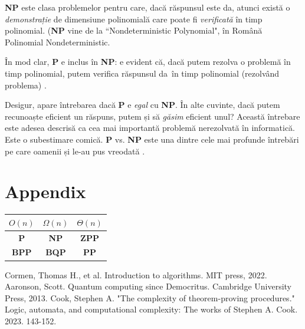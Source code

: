 \documentclass{article}
\begin{document}
\textbf{NP} este clasa problemelor pentru care, dacă răspunsul este \glqq
da\grqq, atunci există o \emph{demonstrație} de dimensiune polinomială care
poate fi \emph{verificată} în timp polinomial. (\textbf{NP} vine de la
``Nondeterministic Polynomial", în Română \glqq Polinomial Nondeterministic\grqq \cite{qcsd}.

În mod clar, \textbf{P} e inclus în \textbf{NP}: e evident că, dacă putem
rezolva o problemă în timp polinomial, putem verifica răspunsul \glqq da\grqq \
în timp polinomial (rezolvând problema) \cite{cook_pvsnp}.

Desigur, apare întrebarea dacă \textbf{P} e \emph{egal} cu \textbf{NP}. În alte
cuvinte, dacă putem recunoaște eficient un răspuns, putem și să \emph{găsim}
eficient unul? Această întrebare este adesea descrisă ca \glqq cea mai importantă
problemă nerezolvată în informatică\grqq. Este o subestimare comică. \textbf{P}
vs. \textbf{NP} este una dintre cele mai profunde întrebări pe care oamenii și
le-au pus vreodată \cite{qcsd}.

\section{Appendix}
\begin{tabular}{| c | c | c |}
	\hline
	$O(n)$       & $\Omega(n)$  & $\Theta(n)$  \\
	\hline
	\textbf{P}   & \textbf{NP}  & \textbf{ZPP} \\
	\hline
	\textbf{BPP} & \textbf{BQP} & \textbf{PP}  \\
	\hline
\end{tabular}

\begin{thebibliography}{ }
	Cormen, Thomas H., et al. Introduction to algorithms. MIT press, 2022.
	\bibitem{qcsd}
	Aaronson, Scott. Quantum computing since Democritus. Cambridge University Press, 2013.
	\bibitem{cook_pvsnp}
	Cook, Stephen A. "The complexity of theorem-proving procedures." Logic,
	automata, and computational complexity: The works of Stephen A. Cook. 2023.
	143-152.
\end{thebibliography}
\end{document}
